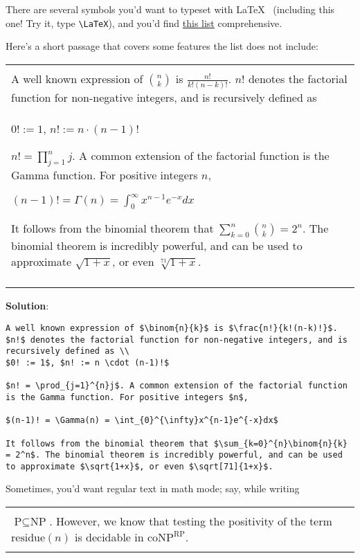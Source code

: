 \documentclass[12pt, letterpaper]{article}
\theoremstyle{remark}
\renewenvironment{boxed}
    {\begin{center}
    \begin{tabular}{|p{0.9\textwidth}|}
    \hline\\
    }
    { 
    \\\\\hline
    \end{tabular} 
    \end{center}
    }
\begin{document}
There are several symbols you'd want to typeset with \LaTeX~ (including this one! Try it, type \verb!\LaTeX!), and you'd find \href{https://oeis.org/wiki/List_of_LaTeX_mathematical_symbols}{this list} \cite{symbols} comprehensive. 

Here's a short passage that covers some features the list does not include:

\begin{boxed}
A well known expression of $\binom{n}{k}$ is $\frac{n!}{k!(n-k)!}$. 
$n!$ denotes the factorial function for non-negative integers, and is recursively defined as \\
$0! := 1$, $n! := n \cdot (n-1)!$

$n! = \prod_{j=1}^{n}j$. A common extension of the factorial function is the Gamma function. For positive integers $n$, 

$(n-1)! = \Gamma(n) = \int_{0}^{\infty}x^{n-1}e^{-x}dx$ 

It follows from the binomial theorem that $\sum_{k=0}^{n}\binom{n}{k} = 2^n$. The binomial theorem is incredibly powerful, and can be used to approximate $\sqrt{1+x}$, or even $\sqrt[71]{1+x}$.
\end{boxed}

\textbf{Solution}:

\begin{lstlisting}
A well known expression of $\binom{n}{k}$ is $\frac{n!}{k!(n-k)!}$. 
$n!$ denotes the factorial function for non-negative integers, and is recursively defined as \\
$0! := 1$, $n! := n \cdot (n-1)!$

$n! = \prod_{j=1}^{n}j$. A common extension of the factorial function is the Gamma function. For positive integers $n$, 

$(n-1)! = \Gamma(n) = \int_{0}^{\infty}x^{n-1}e^{-x}dx$ 

It follows from the binomial theorem that $\sum_{k=0}^{n}\binom{n}{k} = 2^n$. The binomial theorem is incredibly powerful, and can be used to approximate $\sqrt{1+x}$, or even $\sqrt[71]{1+x}$.
\end{lstlisting}

Sometimes, you'd want regular text in math mode; say, while writing 
\begin{boxed}
$\text{P} \subseteq \text{NP}$. However, we know that testing the positivity of the term $\text{residue}(n)$ is decidable in $\text{coNP}^{\text{RP}}$.
\end{boxed}

\newpage
\end{document}
